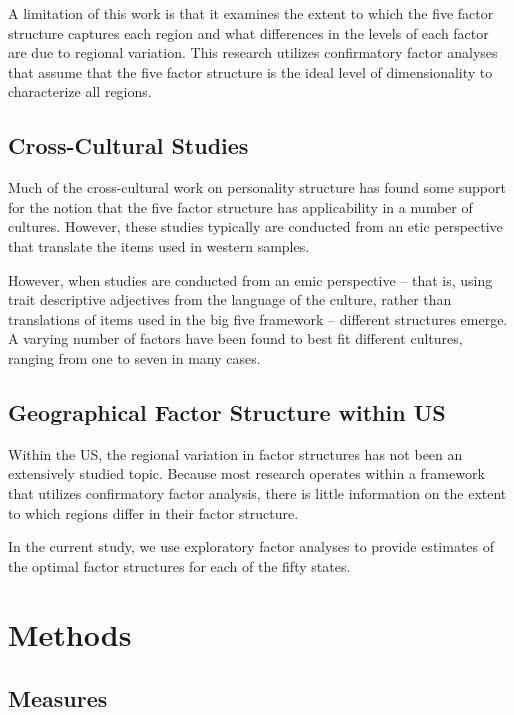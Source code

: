 \documentclass[
  english,
  man]{apa6}
\begin{document}
A limitation of this work is that it examines the extent to which the five factor structure captures each region and what differences in the levels of each factor are due to regional variation. This research utilizes confirmatory factor analyses that assume that the five factor structure is the ideal level of dimensionality to characterize all regions.

\hypertarget{cross-cultural-studies}{%
\subsection{Cross-Cultural Studies}\label{cross-cultural-studies}}

Much of the cross-cultural work on personality structure has found some support for the notion that the five factor structure has applicability in a number of cultures. However, these studies typically are conducted from an etic perspective that translate the items used in western samples.

However, when studies are conducted from an emic perspective -- that is, using trait descriptive adjectives from the language of the culture, rather than translations of items used in the big five framework -- different structures emerge. A varying number of factors have been found to best fit different cultures, ranging from one to seven in many cases.

\hypertarget{geographical-factor-structure-within-us}{%
\subsection{Geographical Factor Structure within US}\label{geographical-factor-structure-within-us}}

Within the US, the regional variation in factor structures has not been an extensively studied topic. Because most research operates within a framework that utilizes confirmatory factor analysis, there is little information on the extent to which regions differ in their factor structure.

In the current study, we use exploratory factor analyses to provide estimates of the optimal factor structures for each of the fifty states.

\hypertarget{methods}{%
\section{Methods}\label{methods}}

\hypertarget{measures}{%
\subsection{Measures}\label{measures}}
\end{document}
